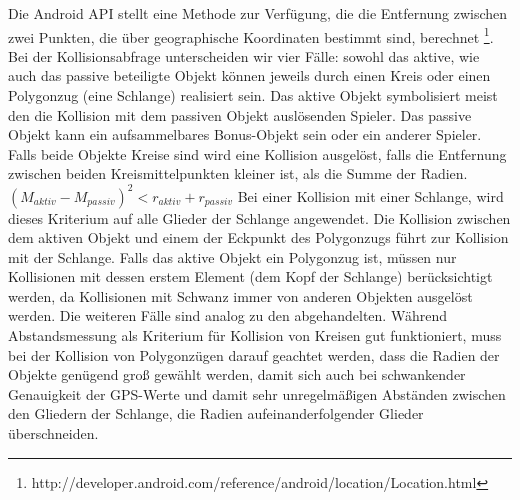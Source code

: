Die Android API stellt eine Methode zur Verfügung, die die Entfernung zwischen zwei Punkten, die über geographische Koordinaten bestimmt sind, berechnet \footnote{http://developer.android.com/reference/android/location/Location.html}.
Bei der Kollisionsabfrage unterscheiden wir vier Fälle: sowohl das aktive, wie auch das passive beteiligte Objekt können jeweils durch einen Kreis oder einen Polygonzug (eine Schlange) realisiert sein.
Das aktive Objekt symbolisiert meist den die Kollision mit dem passiven Objekt auslösenden Spieler.
Das passive Objekt kann ein aufsammelbares Bonus-Objekt sein oder ein anderer Spieler.
Falls beide Objekte Kreise sind wird eine Kollision ausgelöst, falls die Entfernung zwischen beiden Kreismittelpunkten kleiner ist, als die Summe der Radien.
$(M_{aktiv}-M_{passiv})^2<r_{aktiv}+r_{passiv}$
Bei einer Kollision mit einer Schlange, wird dieses Kriterium auf alle Glieder der Schlange angewendet. Die Kollision zwischen dem aktiven Objekt und einem der Eckpunkt des Polygonzugs führt zur Kollision mit der Schlange. 
Falls das aktive Objekt ein Polygonzug ist, müssen nur Kollisionen mit dessen erstem Element (dem Kopf der Schlange) berücksichtigt werden, da Kollisionen mit Schwanz immer von anderen Objekten ausgelöst werden. Die weiteren Fälle sind analog zu den abgehandelten.
Während Abstandsmessung als Kriterium für Kollision von Kreisen gut funktioniert, muss bei der Kollision von Polygonzügen darauf geachtet werden, dass die Radien der Objekte genügend groß gewählt werden, damit sich auch bei schwankender Genauigkeit der GPS-Werte und damit sehr unregelmäßigen Abständen zwischen den Gliedern der Schlange, die Radien aufeinanderfolgender Glieder überschneiden.
